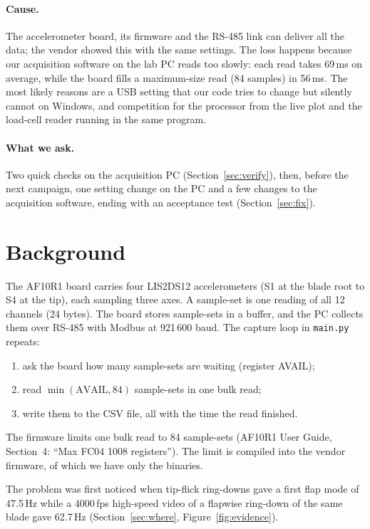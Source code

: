 \documentclass[11pt]{article}
\newcommand{\code}[1]{\texttt{#1}}
\begin{document}
\paragraph{Cause.} The accelerometer board, its firmware and the RS-485 link
can deliver all the data; the vendor showed this with the same settings. The
loss happens because our acquisition software on the lab PC reads too slowly:
each read takes 69\,ms on average, while the board fills a maximum-size read
(84 samples) in 56\,ms. The most likely reasons are a USB setting that our
code tries to change but silently cannot on Windows, and competition for the
processor from the live plot and the load-cell reader running in the same
program.

\paragraph{What we ask.} Two quick checks on the acquisition PC
(Section~\ref{sec:verify}), then, before the next campaign, one setting
change on the PC and a few changes to the acquisition software, ending with
an acceptance test (Section~\ref{sec:fix}).

\section{Background}

The AF10R1 board carries four LIS2DS12 accelerometers (S1 at the blade root
to S4 at the tip), each sampling three axes. A sample-set is one reading of
all 12 channels (24 bytes). The board stores sample-sets in a buffer, and the
PC collects them over RS-485 with Modbus at 921\,600 baud. The capture loop
in \code{main.py} repeats:
\begin{enumerate}[nosep]
  \item ask the board how many sample-sets are waiting (register AVAIL);
  \item read $\min(\text{AVAIL}, 84)$ sample-sets in one bulk read;
  \item write them to the CSV file, all with the time the read finished.
\end{enumerate}
The firmware limits one bulk read to 84 sample-sets (AF10R1 User Guide,
Section~4: ``Max FC04 1008 registers''). The limit is compiled into the
vendor firmware, of which we have only the binaries.

The problem was first noticed when tip-flick ring-downs gave a first flap
mode of 47.5\,Hz while a 4000\,fps high-speed video of a flapwise ring-down
of the same blade gave 62.7\,Hz (Section~\ref{sec:where},
Figure~\ref{fig:evidence}).
\end{document}
